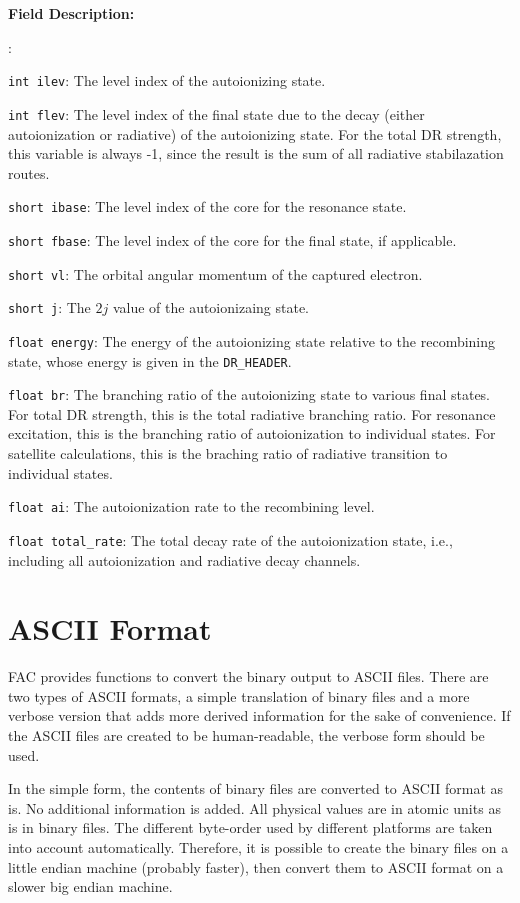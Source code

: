 \documentclass[twoside,letterpaper]{refrep}
\newenvironment{dbdesc}{\textbf{Field Description:} \begin{list}
	{:}{\setlength{\labelwidth}{2in}
	   \setlength{\leftmargin}{2in}
	   \setlength{\labelsep}{0.1in}
	   \setlength{\rightmargin}{0.2in}}}
	{\end{list}}
\begin{document}
\begin{dbdesc}
\item[\texttt{int ilev}:] The level index of the autoionizing state.
\item[\texttt{int flev}:] The level index of the final state due to the decay
(either autoionization or radiative) of the autoionizing state. For the total
DR strength, this variable is always -1, since the result is the sum of all
radiative stabilazation routes.
\item[\texttt{short ibase}:] The level index of the core for the resonance
state. 
\item[\texttt{short fbase}:] The level index of the core for the final
state, if applicable.
\item[\texttt{short vl}:] The orbital angular momentum of the captured
electron. 
\item[\texttt{short j}:] The $2j$ value of the autoionizaing state.
\item[\texttt{float energy}:] The energy of the autoionizing state relative to
the recombining state, whose energy is given in the \texttt{DR\_HEADER}.
\item[\texttt{float br}:] The branching ratio of the autoionizing state to
various final states. For total DR strength, this is the total radiative
branching ratio. For resonance excitation, this is the branching ratio of
autoionization to individual states. For satellite calculations, this is the
braching ratio of radiative transition to individual states.
\item[\texttt{float ai}:] The autoionization rate to the recombining level.
\item[\texttt{float total\_rate}:] The total decay rate of the autoionization
state, i.e., including all autoionization and radiative decay channels.
\end{dbdesc}

\section{ASCII Format}
FAC provides functions to convert the binary output to ASCII files. There are
two types of ASCII formats, a simple translation of binary files and a more
verbose version that adds more derived information for the sake of
convenience. If the ASCII files are created to be human-readable, the
verbose form should be used.

In the simple form, the contents of binary files are converted to ASCII format
as is. No additional information is added. All physical values are in atomic
units as is in binary files. The different byte-order used by different
platforms are taken into account automatically. Therefore, it is possible to
create the binary files on a little endian machine (probably faster), then
convert them to ASCII format on a slower big endian machine.
\end{document}
